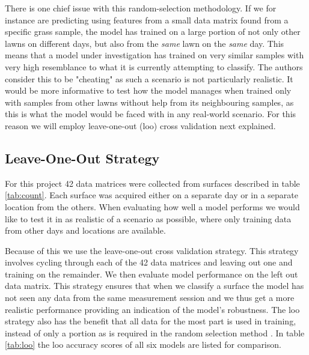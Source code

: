 There is one chief issue with this random-selection methodology. If we for instance are predicting using features from a small data matrix found from a specific grass sample, the model has trained on a large portion of not only other lawns on different days, but also from the \emph{same} lawn on the \emph{same} day. This means that a model under investigation has trained on very similar samples with very high resemblance to what it is currently attempting to classify. The authors consider this to be "cheating" as such a scenario is not particularly realistic. It would be more informative to test how the model manages when trained only with samples from other lawns without help from its neighbouring samples, as this is what the model would be faced with in any real-world scenario. For this reason we will employ leave-one-out (\gls{loo}) cross validation next explained. 





\subsection{Leave-One-Out Strategy}


For this project 42 data matrices were collected from surfaces described in table \ref{tab:count}. Each surface was acquired either on a separate day or in a separate location from the others. When evaluating how well a model performs we would like to test it in as realistic of a scenario as possible, where only training data from other days and locations are available. 

Because of this we use the leave-one-out cross validation strategy. This strategy involves cycling through each of the 42 data matrices and leaving out one and training on the remainder. We then evaluate model performance on the left out data matrix. This strategy ensures that when we classify a surface the model has not seen any data from the same measurement session and we thus get a more realistic performance providing an indication of the model's robustness. The \gls{loo} strategy also has the benefit that all data for the most part is used in training, instead of only a portion as is required in the random selection method \citep{raschka}. In table \ref{tab:loo} the \gls{loo} accuracy scores of all six models are listed for comparison. 

